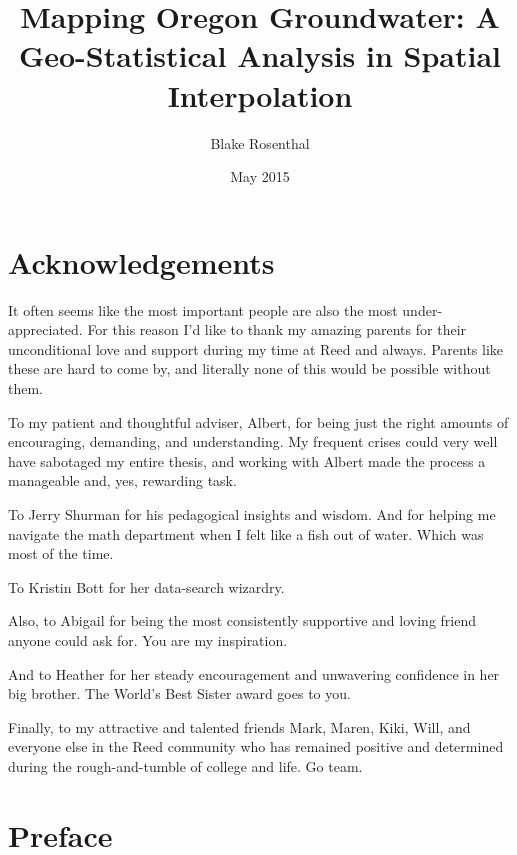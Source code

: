 \documentclass[12pt,twoside]{reedthesis}
\title{Mapping Oregon Groundwater: A Geo-Statistical Analysis in Spatial Interpolation}
\author{Blake Rosenthal}
\date{May 2015}
\begin{document}
  \maketitle
  \frontmatter %
  \pagestyle{empty} %
  
  \onehalfspacing


    \chapter*{Acknowledgements}
	It often seems like the most important people are also the most under-appreciated. For this reason I'd like to thank my amazing parents for their unconditional love and support during my time at Reed and always. Parents like these are hard to come by, and literally none of this would be possible without them.
	
	To my patient and thoughtful adviser, Albert, for being just the right amounts of encouraging, demanding, and understanding. My frequent crises could very well have sabotaged my entire thesis, and working with Albert made the process a manageable and, yes, rewarding task. 
	
	To Jerry Shurman for his pedagogical insights and wisdom. And for helping me navigate the math department when I felt like a fish out of water. Which was most of the time.
	
	To Kristin Bott for her data-search wizardry.
	
	Also, to Abigail for being the most consistently supportive and loving friend anyone could ask for. You are my inspiration. 
	
	And to Heather for her steady encouragement and unwavering confidence in her big brother. The World's Best Sister award goes to you.
	
	Finally, to my attractive and talented friends Mark, Maren, Kiki, Will, and everyone else in the Reed community who has remained positive and determined during the rough-and-tumble of college and life. Go team.


    \chapter*{Preface}
    
\end{document}
